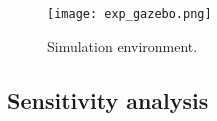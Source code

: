 
\begin{figure}[!htbp] 
\centering
\texttt{[image: exp\_gazebo.png]}%
\caption{Simulation environment.}
\label{fig:gazebo_sim}
\end{figure}	
\subsection{Sensitivity analysis}
